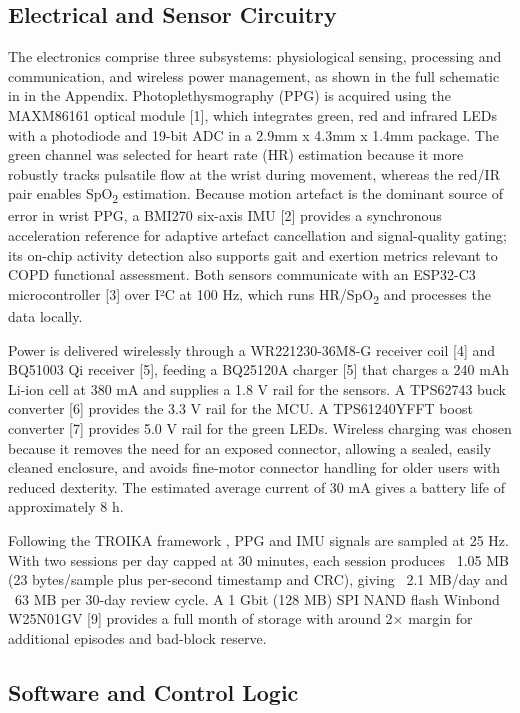 \subsection{Electrical and Sensor Circuitry}

The electronics comprise three subsystems: physiological sensing, processing and communication, and wireless power management, as shown in the full schematic in  in the Appendix. Photoplethysmography (PPG) is acquired using the MAXM86161 optical module [1], which integrates green, red and infrared LEDs with a photodiode and 19-bit ADC in a 2.9mm x 4.3mm x 1.4mm package. The green channel was selected for heart rate (HR) estimation because it more robustly tracks pulsatile flow at the wrist during movement, whereas the red/IR pair enables SpO\textsubscript{2} estimation. Because motion artefact is the dominant source of error in wrist PPG, a BMI270 six-axis IMU [2] provides a synchronous acceleration reference for adaptive artefact cancellation and signal-quality gating; its on-chip activity detection also supports gait and exertion metrics relevant to COPD functional assessment. Both sensors communicate with an ESP32-C3 microcontroller [3] over I²C at 100 Hz, which runs HR/SpO\textsubscript{2} and processes the data locally. 

Power is delivered wirelessly through a WR221230-36M8-G receiver coil [4] and BQ51003 Qi receiver [5], feeding a BQ25120A charger [5] that charges a 240 mAh Li-ion cell at 380 mA and supplies a 1.8 V rail for the sensors. A TPS62743 buck converter [6] provides the 3.3 V rail for the MCU. A TPS61240YFFT boost converter [7] provides 5.0 V rail for the green LEDs. Wireless charging was chosen because it removes the need for an exposed connector, allowing a sealed, easily cleaned enclosure, and avoids fine-motor connector handling for older users with reduced dexterity. The estimated average current of 30 mA gives a battery life of approximately 8 h. 

Following the TROIKA framework \cite{zhang2015troika}, PPG and IMU signals are sampled at 25 Hz. With two sessions per day capped at 30 minutes, each session produces ~1.05 MB (23 bytes/sample plus per-second timestamp and CRC), giving ~2.1 MB/day and ~63 MB per 30-day review cycle. A 1 Gbit (128 MB) SPI NAND flash Winbond W25N01GV [9] provides a full month of storage with around 2× margin for additional episodes and bad-block reserve. 

\subsection{Software and Control Logic}

